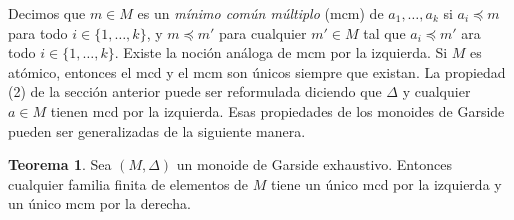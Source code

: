 \documentclass[12pt]{book}
\theoremstyle{definition}
\newtheorem{teor}{Teorema}[section]
\begin{document}
Decimos que $m\in M$ es un \textit{mínimo común múltiplo} (mcm) de $a_1,\ldots,a_k$ si $a_i\preceq m$ para todo $i\in\{1,\ldots,k\}$, y $m\preceq m'$ para cualquier $m'\in M$ tal que $a_i\preceq m'$ ara todo $i\in\{1,\ldots,k\}$. Existe la noción análoga de mcm por la izquierda. Si $M$ es atómico, entonces el mcd y el mcm son únicos siempre que existan. La propiedad (2) de la sección anterior puede ser reformulada diciendo que $\Delta$ y cualquier $a\in M$ tienen mcd por la izquierda. Esas propiedades de los monoides de Garside pueden ser generalizadas de la siguiente manera.

\begin{teor}
Sea $(M,\Delta)$ un monoide de Garside exhaustivo. Entonces cualquier familia finita de elementos de $M$ tiene un único mcd por la izquierda y un único mcm por la derecha.
\end{teor}
\end{document}
